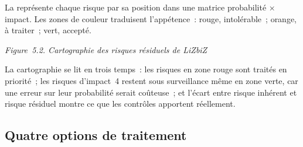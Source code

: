La 
représente chaque risque par sa position dans une matrice probabilité ×
impact. Les zones de couleur traduisent l'appétence~: rouge, intolérable~;
orange, à traiter~; vert, accepté.

\noindent\begin{minipage}{\linewidth}
\begin{center}
\end{center}
\vspace{-0.4em}
\begin{center}{\small\itshape Figure~5.2. Cartographie des risques
résiduels de LiZbiZ}\end{center}
\end{minipage}

\medskip

La cartographie se lit en trois temps~: les risques en zone rouge sont
traités en priorité~; les risques d'impact~4 restent sous surveillance même
en zone verte, car une erreur sur leur probabilité serait coûteuse~; et
l'écart entre risque inhérent et risque résiduel montre ce que les
contrôles apportent réellement.

\subsection{Quatre options de traitement}

